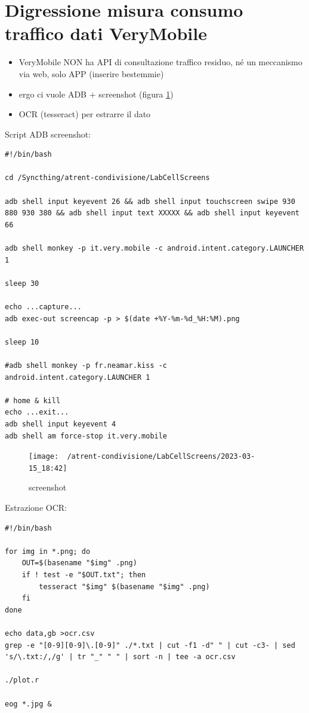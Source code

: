 \documentclass[a4paper,12pt]{article}
\begin{document}
\section{Digressione misura consumo traffico dati VeryMobile}
\begin{itemize}
\item VeryMobile NON ha API di consultazione traffico residuo, né un meccanismo via web, solo APP (inserire bestemmie)
\item ergo ci vuole ADB + screenshot (figura \ref{fig:screenshot})
\item OCR (tesseract) per estrarre il dato
\end{itemize}

Script ADB screenshot:
\begin{lstlisting}
#!/bin/bash

cd /Syncthing/atrent-condivisione/LabCellScreens

adb shell input keyevent 26 && adb shell input touchscreen swipe 930 880 930 380 && adb shell input text XXXXX && adb shell input keyevent 66

adb shell monkey -p it.very.mobile -c android.intent.category.LAUNCHER 1 

sleep 30

echo ...capture...
adb exec-out screencap -p > $(date +%Y-%m-%d_%H:%M).png

sleep 10

#adb shell monkey -p fr.neamar.kiss -c android.intent.category.LAUNCHER 1 

# home & kill
echo ...exit...
adb shell input keyevent 4
adb shell am force-stop it.very.mobile
\end{lstlisting}



\begin{figure}
	\centering
	\texttt{[image: ~/atrent-condivisione/LabCellScreens/2023-03-15\_18:42]}
	\caption{screenshot}
	\label{fig:screenshot}
\end{figure}



Estrazione OCR:
\begin{lstlisting}
#!/bin/bash

for img in *.png; do
	OUT=$(basename "$img" .png)
	if ! test -e "$OUT.txt"; then
		tesseract "$img" $(basename "$img" .png)
	fi
done

echo data,gb >ocr.csv
grep -e "[0-9][0-9]\.[0-9]" ./*.txt | cut -f1 -d" " | cut -c3- | sed 's/\.txt:/,/g' | tr "_" " " | sort -n | tee -a ocr.csv

./plot.r

eog *.jpg &
\end{lstlisting}
\end{document}
